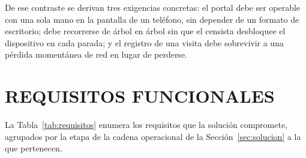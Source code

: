 De ese contraste se derivan tres exigencias concretas: el portal debe ser operable con una sola mano
en la pantalla de un teléfono, sin depender de un formato de escritorio; debe recorrerse de árbol en
árbol sin que el censista desbloquee el dispositivo en cada parada; y el registro de una visita debe
sobrevivir a una pérdida momentánea de red en lugar de perderse.

\section{REQUISITOS FUNCIONALES}
\label{sec:requisitos-funcionales}

La Tabla~\ref{tab:requisitos} enumera los requisitos que la solución compromete, agrupados por la
etapa de la cadena operacional de la Sección~\ref{sec:solucion} a la que pertenecen.

